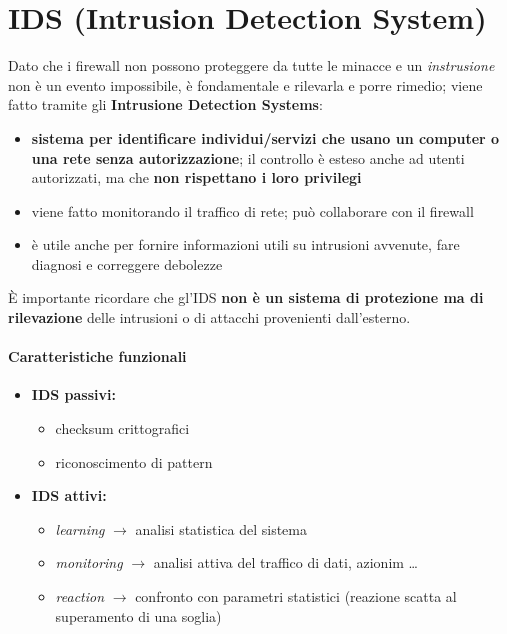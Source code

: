 \chapter{IDS (Intrusion Detection System)}

Dato che i firewall non possono proteggere da tutte le minacce e un \textit{instrusione}
non è un evento impossibile, è fondamentale e rilevarla e porre rimedio; viene 
fatto tramite gli \textbf{Intrusione Detection Systems}:
\begin{itemize}
    \item \textbf{sistema per identificare individui/servizi che usano un computer o una 
    rete senza autorizzazione}; il controllo è esteso anche ad utenti autorizzati, ma 
    che \textbf{non rispettano i loro privilegi}
    \item viene fatto monitorando il traffico di rete; può collaborare con il firewall
    \item è utile anche per fornire informazioni utili su intrusioni avvenute, fare diagnosi e correggere debolezze
\end{itemize} 

\noindent È importante ricordare che gl'IDS \textbf{non è un sistema di protezione 
ma di rilevazione} delle intrusioni o di attacchi provenienti dall'esterno.

\subsubsection{Caratteristiche funzionali}
\begin{itemize}
    \item \textbf{IDS passivi:}
    \begin{itemize}
        \item checksum crittografici 
        \item riconoscimento di pattern 
    \end{itemize}
    \item \textbf{IDS attivi:}
    \begin{itemize}
        \item \textit{learning} $\rightarrow$ analisi statistica del sistema 
        \item \textit{monitoring} $\rightarrow$ analisi attiva del traffico di dati, azionim \dots
        \item \textit{reaction} $\rightarrow$ confronto con parametri statistici (reazione scatta al superamento di una soglia)
    \end{itemize}
\end{itemize}

